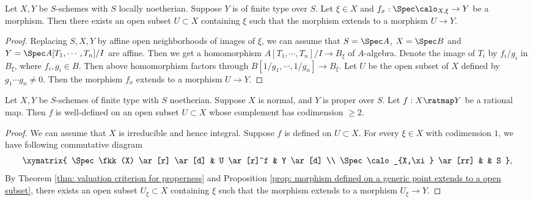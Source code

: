     \begin{proposition}\label{prop: morphism defined on a generic point extends to a open subset}
        Let $X,Y$ be $S$-schemes with $S$ locally noetherian.
        Suppose $Y$ is of finite type over $S$.
        Let $\xi \in X$ and $f_x: \Spec \calo_{X,\xi} \to Y$ be a morphism.
        Then there exists an open subset $U \subset X$ containing $\xi$ such that the morphism extends to a morphism $U \to Y$.
    \end{proposition}
    \begin{proof}
        Replacing $S,X,Y$ by affine open neighborhoods of images of $\xi$, we can assume that $S = \Spec A$, $X=\Spec B$ and $Y = \Spec A[T_1,\cdots,T_n]/I$ are affine.
        Then we get a homomorphism $A[T_1,\cdots,T_n]/I \to B_{\xi}$ of $A$-algebra.
        Denote the image of $T_i$ by $f_i/g_i$ in $B_{\xi}$, where $f_i,g_i \in B$.
        Then above homomorphism factors through $B[1/g_1,\cdots,1/g_n] \to B_{\xi}$.
        Let $U$ be the open subset of $X$ defined by $g_1\cdots g_n \neq 0$.
        Then the morphism $f_x$ extends to a morphism $U \to Y$.
    \end{proof}

    \begin{theorem}\label{thm: extension of morphism form normal to proper}
        Let $X,Y$ be $S$-schemes of finite type with $S$ noetherian.
        Suppose $X$ is normal, and $Y$ is proper over $S$.
        Let $f:X \ratmap Y$ be a rational map.
        Then $f$ is well-defined on an open subset $U \subset X$ whose complement has codimension $\geq 2$.
    \end{theorem}
    \begin{proof}
        We can assume that $X$ is irreducible and hence integral.
        Suppose $f$ is defined on $U \subset X$.
        For every $\xi \in X$ with codimension $1$, we have following commutative diagram
        \[ \xymatrix{
            \Spec \fkk(X) \ar[r] \ar[d] & U \ar[r]^f & Y \ar[d] \\
            \Spec \calo_{X,\xi} \ar[rr] & & S
        }, \]
        By Theorem \ref{thm: valuation criterion for properness} and Proposition \ref{prop: morphism defined on a generic point extends to a open subset}, there exists an open subset $U_\xi \subset X$ containing $\xi$ such that the morphism extends to a morphism $U_\xi \to Y$.

    \end{proof}

